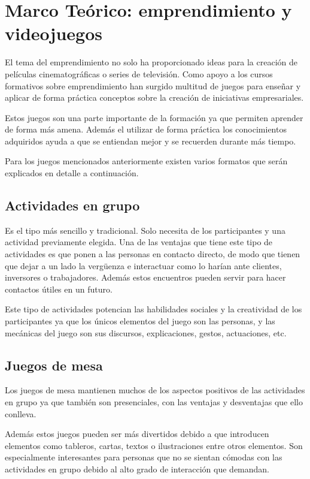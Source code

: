 \chapter{Marco Teórico: emprendimiento y videojuegos}
\label{marcoteorico}

El tema del emprendimiento no solo ha proporcionado ideas para la creación de películas cinematográficas o series de televisión. Como apoyo a los cursos formativos sobre emprendimiento han surgido multitud de juegos para enseñar y aplicar de forma práctica conceptos sobre la creación de iniciativas empresariales.

Estos juegos son una parte importante de la formación ya que permiten aprender de forma más amena. Además el utilizar de forma práctica los conocimientos adquiridos ayuda a que se entiendan mejor y se recuerden durante más tiempo.

Para los juegos mencionados anteriormente existen varios formatos que serán explicados en detalle a continuación. 

\section{Actividades en grupo}

Es el tipo más sencillo y tradicional. Solo necesita de los participantes y una actividad previamente elegida. Una de las ventajas que tiene este tipo de actividades es que ponen a las personas en contacto directo, de modo que tienen que dejar a un lado la vergüenza e interactuar como lo harían ante clientes, inversores o trabajadores. Además estos encuentros pueden servir para hacer contactos útiles en un futuro.

Este tipo de actividades potencian las habilidades sociales y la creatividad de los participantes ya que los únicos elementos del juego son las personas, y las mecánicas del juego son sus discursos, explicaciones, gestos, actuaciones, etc.

\section{Juegos de mesa}

Los juegos de mesa mantienen muchos de los aspectos positivos de las actividades en grupo ya que también son presenciales, con las ventajas y desventajas que ello conlleva.

Además estos juegos pueden ser más divertidos debido a que introducen elementos como tableros, cartas, textos o ilustraciones entre otros elementos. Son especialmente interesantes para personas que no se sientan cómodas con las actividades en grupo debido al alto grado de interacción que demandan.

